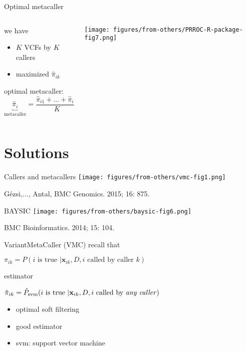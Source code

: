 \documentclass{beamer} %
\begin{document}
\begin{frame}{Optimal metacaller}
\begin{columns}[t]
\begin{column}{0.45\textwidth}
we have
\begin{itemize}
\item \(K\) VCFs by \(K\) callers
\item maximized \(\hat{\pi}_{ik}\)
\end{itemize}
\bigskip

optimal metacaller:
\[\underbrace{\hat{\pi}_{i}}_{\text{metacaller}} = \frac{\hat{\pi}_{i1} + ... + \hat{\pi}_{iK}}{K}\]
\end{column}
\begin{column}{0.6\textwidth}

\texttt{[image: figures/from-others/PRROC-R-package-fig7.png]}
\end{column}
\end{columns}

\end{frame}

\section{Solutions}

\begin{frame}{Callers and metacallers}
\texttt{[image: figures/from-others/vmc-fig1.png]}
\bigskip

{\footnotesize G\'{e}zsi,..., Antal, BMC Genomics. 2015; 16: 875.}
\end{frame}

\begin{frame}{BAYSIC}
\texttt{[image: figures/from-others/baysic-fig6.png]}
\bigskip

{\footnotesize BMC Bioinformatics. 2014; 15: 104.}
\end{frame}

\begin{frame}{VariantMetaCaller (VMC)}
recall that

\(\pi_{ik} = P(i \text{ is true } | \mathbf{x}_{ik}, D, i \text{ called by
caller } k)\)
\bigskip

estimator

\(\hat{\pi}_{ik} = \hat{P}_{\text{svm}}(i \text{ is true } | \mathbf{x}_{ik},
D, i \text{ called by \emph{any caller}} )\)
\begin{itemize}
\item optimal soft filtering
\item good estimator 
\item svm: support vector machine
\end{itemize}
\end{frame}
\end{document}
